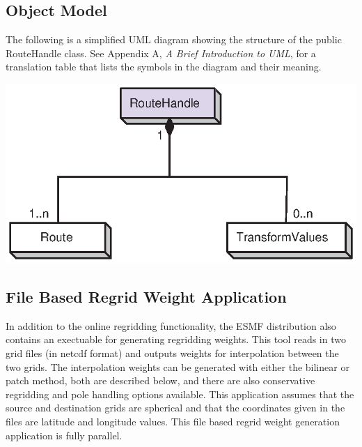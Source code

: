 \subsection{Object Model}

The following is a simplified UML diagram showing the structure of the public
RouteHandle class.  See Appendix A, {\it A Brief Introduction to UML}, for a
translation table that lists the symbols in the diagram and their meaning.

\begin{center}
\includegraphics{RouteHandle_obj}
\end{center}


\subsection{File Based Regrid Weight Application}
\label{sec:regrid:offline}

 In addition to the online regridding functionality, the ESMF distribution also 
contains an exectuable for generating regridding weights. This tool reads in
two grid files (in netcdf format) and outputs weights for interpolation
between the two grids.  The interpolation weights can be generated with either the bilinear
or patch method, both are described below, and there are also conservative regridding 
and pole handling options available.
This application assumes that the source and destination grids
are spherical and that the coordinates given in the files are latitude and longitude
values. This file based regrid weight generation application is fully parallel.

